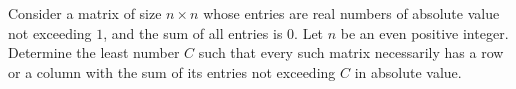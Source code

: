 Consider a matrix of size $n \times n$ whose entries are real numbers of absolute value not exceeding $1$, and the sum of all entries is $0$. Let $n$ be an even positive integer. Determine the least number $C$ such that every such matrix necessarily has a row or a column with the sum of its entries not exceeding $C$ in absolute value.
